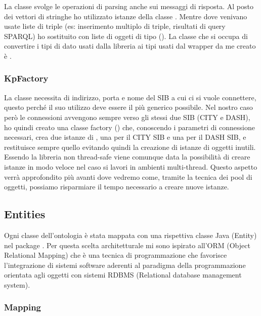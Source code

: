 La classe  svolge le operazioni di parsing anche sui messaggi di risposta. Al posto dei vettori di stringhe ho utilizzato istanze della classe . Mentre dove venivano usate liste di triple (es: inserimento multiplo di triple, risultati di query SPARQL) ho sostituito con liste di oggeti di tipo  (). La classe che si occupa di convertire i tipi di dato usati dalla libreria  ai tipi usati dal wrapper da me creato è .

\subsubsection{KpFactory}

La classe  necessita di indirizzo, porta e nome del SIB a cui ci si vuole connettere, questo perché il suo utilizzo deve essere il più generico possibile. Nel nostro caso però le connessioni avvengono sempre verso gli stessi due SIB (CITY e DASH), ho quindi creato una classe factory () che, conoscendo i parametri di connessione necessari, crea due istanze di , una per il CITY SIB e una per il DASH SIB, e restituisce sempre quello evitando quindi la creazione di istanze di oggetti inutili. Essendo la libreria  non thread-safe viene comunque data la possibilità di creare istanze in modo veloce nel caso si lavori in ambienti multi-thread. Questo aspetto verrà approfondito più avanti dove vedremo come, tramite la tecnica dei pool di oggetti, possiamo risparmiare il tempo necessario a creare nuove istanze.


\subsection{Entities}

Ogni classe dell'ontologia è stata mappata con una rispettiva classe Java (Entity) nel package  . Per questa scelta architetturale mi sono ispirato all'ORM (Object Relational Mapping) che è una tecnica di programmazione che favorisce l'integrazione di sistemi software aderenti al paradigma della programmazione orientata agli oggetti con sistemi RDBMS (Relational database management system). %

\subsubsection{Mapping} 

